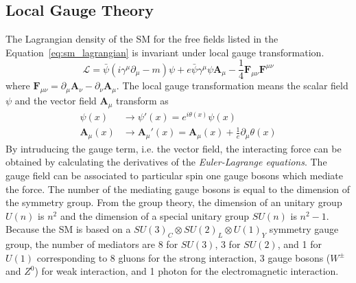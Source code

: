 
\subsection{Local Gauge Theory}
\label{subsec:sm_gauge_theory}
The Lagrangian density of the SM for the free fields listed in the Equation~\ref{eq:sm_lagrangian} is invariant under local gauge transformation.
\begin{equation}
\mathcal{L} = \bar{\psi}(i\gamma^{\mu}\partial_{\mu} - m)\psi + e\bar{\psi}\gamma^{\mu}\psi\bm{A}_{\mu} - \frac{1}{4}\bm{F}_{\mu\nu}\bm{F}^{\mu\nu}
\label{eq:sm_lagrangian}
\end{equation}
where $\bm{F}_{\mu\nu} = \partial_{\mu}\bm{A}_{\nu} - \partial_{\nu}\bm{A}_{\mu}$.
The local gauge transformation means the scalar field $\psi$ and the vector field $\bm{A}_{\mu}$ transform as
\begin{align}
\psi(x) & \rightarrow \psi'(x) = e^{i\theta(x)}\psi(x)\\
\bm{A}_{\mu}(x) & \rightarrow \bm{A}_{\mu}'(x) = \bm{A}_{\mu}(x) + \frac{1}{e}\partial_{\mu}\theta(x)
\label{eq:sm_gauge_transformation}
\end{align}
By intruducing the gauge term, i.e. the vector field, the interacting force can be obtained by calculating the derivatives of the \textit{Euler-Lagrange equations}.
The gauge field can be associated to particular spin one gauge bosons which mediate the force.
The number of the mediating gauge bosons is equal to the dimension of the symmetry group.
From the group theory, the dimension of an unitary group $U(n)$ is $n^{2}$ and the dimension of a special unitary group $SU(n)$ is $n^{2} - 1$.
Because the SM is based on a $SU(3)_{C} \otimes SU(2)_{L} \otimes U(1)_{Y}$ symmetry gauge group, the number of mediators are 8 for $SU(3)$, 3 for $SU(2)$, and 1 for $U(1)$ corresponding to 8 gluons for the strong interaction, 3 gauge bosons ($W^{\pm}$ and $Z^{0}$) for weak interaction, and 1 photon for the electromagnetic interaction.



